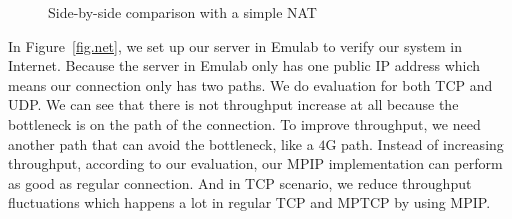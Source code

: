 \begin{figure}[htb]
\caption{Side-by-side comparison with a simple NAT}
\label{fig.nat}
\end{figure}


In Figure~\ref{fig.net}, we set up our server in Emulab to verify our system in Internet. Because the server in Emulab only has one public IP address which means our connection only has two paths. We do evaluation for both TCP and UDP. We can see that there is not throughput increase at all because the bottleneck is on the path of the connection. To improve throughput, we need another path that can avoid the bottleneck, like a $4$G path. Instead of increasing throughput, according to our evaluation, our MPIP implementation can perform as good as regular connection. And in TCP scenario, we reduce throughput fluctuations which happens a lot in regular TCP and MPTCP by using MPIP.

